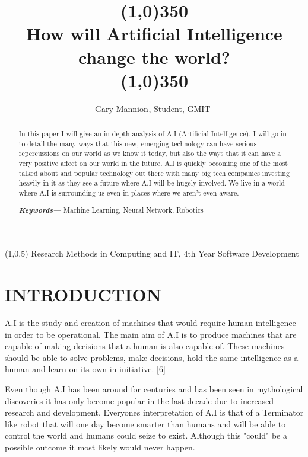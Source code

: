 \documentclass[letterpaper, 10 pt, conference]{ieeeconf}  %
\title{\line(1,0){350}\\How will Artificial Intelligence change the world?\\\line(1,0){350}}
\author{Gary Mannion$^{}$, Student, GMIT $^{}$%
}
\begin{document}
\begin{textblock}{9}(1,0.5)
\noindent\small Research Methods in Computing and IT, 4th Year Software Development
\end{textblock}


\maketitle
\thispagestyle{empty}
\pagestyle{empty}


\begin{abstract} \newline
In this paper I will give an in-depth analysis of A.I (Artificial Intelligence). I will go in to detail the many ways that this new, emerging technology can have serious repercussions on our world as we know it today, but also the ways that it can have a very positive affect on our world in the future. A.I is quickly becoming one of the most talked about and popular technology out there with many big tech companies investing heavily in it as they see a future where A.I will be hugely involved. We live in a world where A.I is surrounding us even in places where we aren't even aware. \vspace{2mm}

\textbf{\textit{Keywords---}} Machine Learning, Neural Network, Robotics
\end{abstract}


\section{INTRODUCTION}

A.I is the study and creation of machines that would require human intelligence in order to be operational. The main aim of A.I is to produce machines that are capable of making decisions that a human is also capable of. These machines should be able to solve problems, make decisions, hold the same intelligence as a human and learn on its own in initiative. [6]

Even though A.I has been around for centuries and has been seen in mythological discoveries it has only become popular in the last decade due to increased research and development. Everyones interpretation of A.I is that of a Terminator like robot that will one day become smarter than humans and will be able to control the world and humans could seize to exist. Although this "could" be a possible outcome it most likely would never happen. 
\end{document}

